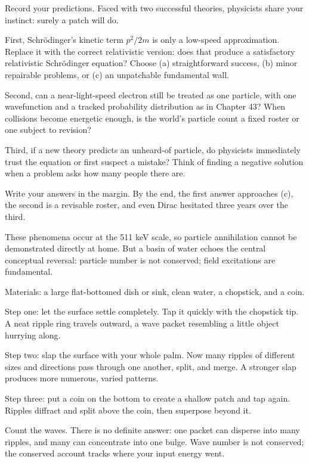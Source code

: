 
Record your predictions. Faced with two successful theories, physicists share your instinct: surely a patch will do.

First, Schrödinger's kinetic term \(p^2/2m\) is only a low-speed approximation. Replace it with the correct relativistic version: does that produce a satisfactory relativistic Schrödinger equation? Choose (a) straightforward success, (b) minor repairable problems, or (c) an unpatchable fundamental wall.

Second, can a near-light-speed electron still be treated as one particle, with one wavefunction and a tracked probability distribution as in Chapter 43? When collisions become energetic enough, is the world's particle count a fixed roster or one subject to revision?

Third, if a new theory predicts an unheard-of particle, do physicists immediately trust the equation or first suspect a mistake? Think of finding a negative solution when a problem asks how many people there are.

Write your answers in the margin. By the end, the first answer approaches (c), the second is a revisable roster, and even Dirac hesitated three years over the third.


These phenomena occur at the 511 keV scale, so particle annihilation cannot be demonstrated directly at home. But a basin of water echoes the central conceptual reversal: particle number is not conserved; field excitations are fundamental.

\begin{experiment}
Materials: a large flat-bottomed dish or sink, clean water, a chopstick, and a coin.

Step one: let the surface settle completely. Tap it quickly with the chopstick tip. A neat ripple ring travels outward, a wave packet resembling a little object hurrying along.

Step two: slap the surface with your whole palm. Now many ripples of different sizes and directions pass through one another, split, and merge. A stronger slap produces more numerous, varied patterns.

Step three: put a coin on the bottom to create a shallow patch and tap again. Ripples diffract and split above the coin, then superpose beyond it.

Count the waves. There is no definite answer: one packet can disperse into many ripples, and many can concentrate into one bulge. Wave number is not conserved; the conserved account tracks where your input energy went.
\end{experiment}

